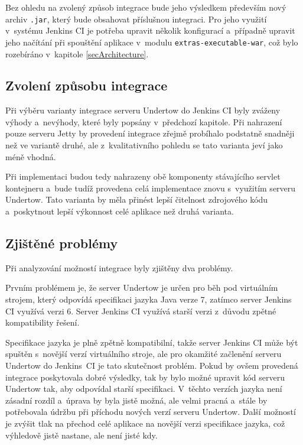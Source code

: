             Bez ohledu na zvolený způsob integrace bude jeho výsledkem především nový archiv \texttt{.jar},
            který bude obsahovat příslušnou integraci. Pro jeho využití v~systému Jenkins CI je potřeba
            upravit několik konfigurací a~případně upravit jeho načítání při spouštění aplikace v~modulu
            \texttt{extras-executable-war}, což bylo rozebíráno v~kapitole \ref{secArchitecture}.


        \subsection{Zvolení způsobu integrace}
            Při výběru varianty integrace serveru Undertow do Jenkins CI byly zváženy
            výhody a~nevýhody, které byly popsány v~předchozí kapitole. Při nahrazení pouze serveru Jetty
            by provedení integrace zřejmě probíhalo podstatně snadněji než ve variantě druhé,
            ale z~kvalitativního pohledu se tato varianta jeví jako méně vhodná. 

            Při implementaci budou tedy nahrazeny obě komponenty stávajícího servlet kontejneru
            a~bude tudíž provedena celá implementace znovu s~využitím serveru Undertow. Tato
            varianta by měla přinést lepší čitelnost zdrojového kódu a~poskytnout 
            lepší výkonnost celé aplikace než druhá varianta.

        \subsection{Zjištěné problémy}
            Při analyzování možností integrace byly zjištěny dva problémy.

            Prvním problémem je, že server Undertow
            je určen pro běh pod virtuálním strojem, který odpovídá specifikaci jazyka
            Java verze 7, zatímco server Jenkins CI využívá verzi 6. 
            Server Jenkins CI využívá starší verzi z~důvodu zpětné kompatibility
            řešení. 
            
            Specifikace jazyka je plně zpětně kompatibilní, takže server Jenkins CI
            může být spuštěn s~novější verzí virtuálního stroje, ale pro okamžité začlenění
            serveru Undertow do Jenkins~CI je tato skutečnost problém. Pokud by ovšem
            provedená integrace poskytovala dobré výsledky, tak by bylo možné 
            upravit kód serveru Undertow tak, aby odpovídal starší specifikaci.
            V~těchto verzích jazyka není zásadní rozdíl a~úprava by byla jistě
            možná, ale velmi pracná a~stále by potřebovala údržbu při příchodu
            nových verzí serveru Undertow. Další možností je
            zvýšit tlak na přechod celé aplikace na novější verzi specifikace jazyka,
            což výhledově jistě nastane, ale není jisté kdy. 

